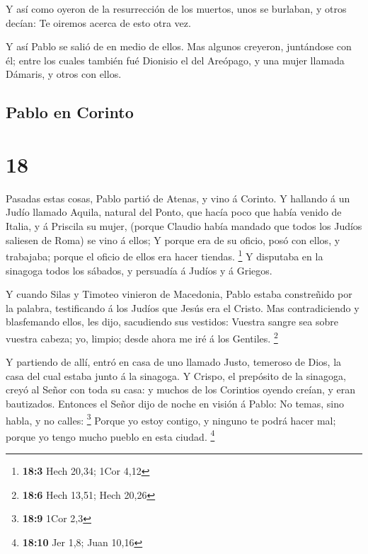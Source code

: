  Y así como oyeron de la resurrección de los muertos, unos
se burlaban, y otros decían: Te oiremos acerca de esto otra vez.

 Y así Pablo se salió de en medio de ellos. 
Mas algunos creyeron, juntándose con él; entre los cuales también fué
Dionisio el del Areópago, y una mujer llamada Dámaris, y otros con
ellos.

\hypertarget{pablo-en-corinto}{%
\subsection{Pablo en Corinto}\label{pablo-en-corinto}}

\hypertarget{section-17}{%
\section{18}\label{section-17}}

 Pasadas estas cosas, Pablo partió de Atenas, y vino á
Corinto.  Y hallando á un Judío llamado Aquila, natural del
Ponto, que hacía poco que había venido de Italia, y á Priscila su mujer,
(porque Claudio había mandado que todos los Judíos saliesen de Roma) se
vino á ellos;  Y porque era de su oficio, posó con ellos, y
trabajaba; porque el oficio de ellos era hacer tiendas. \footnote{\textbf{18:3}
  Hech 20,34; 1Cor 4,12}  Y disputaba en la sinagoga todos
los sábados, y persuadía á Judíos y á Griegos.

 Y cuando Silas y Timoteo vinieron de Macedonia, Pablo
estaba constreñido por la palabra, testificando á los Judíos que Jesús
era el Cristo.  Mas contradiciendo y blasfemando ellos, les
dijo, sacudiendo sus vestidos: Vuestra sangre sea sobre vuestra cabeza;
yo, limpio; desde ahora me iré á los Gentiles. \footnote{\textbf{18:6}
  Hech 13,51; Hech 20,26}

 Y partiendo de allí, entró en casa de uno llamado Justo,
temeroso de Dios, la casa del cual estaba junto á la sinagoga.
 Y Crispo, el prepósito de la sinagoga, creyó al Señor con
toda su casa: y muchos de los Corintios oyendo creían, y eran
bautizados.  Entonces el Señor dijo de noche en visión á
Pablo: No temas, sino habla, y no calles: \footnote{\textbf{18:9} 1Cor
  2,3}  Porque yo estoy contigo, y ninguno te podrá hacer
mal; porque yo tengo mucho pueblo en esta ciudad. \footnote{\textbf{18:10}
  Jer 1,8; Juan 10,16}

